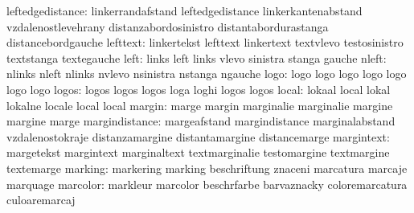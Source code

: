          leftedgedistance: linkerrandafstand         leftedgedistance
                           linkerkantenabstand       vzdalenostlevehrany
                           distanzabordosinistro     distantabordurastanga
                           distancebordgauche
                 lefttext: linkertekst               lefttext
                           linkertext                textvlevo
                           testosinistro             textstanga
                           textegauche
                     left: links                     left
                           links                     vlevo
                           sinistra                  stanga
                           gauche
                    nleft: nlinks                    nleft
                           nlinks                    nvlevo
                           nsinistra                 nstanga
                           ngauche
                     logo: logo                      logo
                           logo                      logo
                           logo                      logo
                           logo
                    logos: logos                     logos
                           logos                     loga
                           loghi                     logos
                           logos
                    local: lokaal                    local
                           lokal                     lokalne
                           locale                    local
                           local
                   margin: marge                     margin
                           marginalie                marginalie
                           margine                   margine
                           marge
           margindistance: margeafstand              margindistance
                           marginalabstand           vzdalenostokraje
                           distanzamargine           distantamargine
                           distancemarge
               margintext: margetekst                margintext
                           marginaltext              textmarginalie
                           testomargine              textmargine
                           textemarge
                  marking: markering                 marking
                           beschriftung              znaceni
                           marcatura                 marcaje
                           marquage
                 marcolor: markleur                  marcolor
                           beschrfarbe               barvaznacky
                           coloremarcatura           culoaremarcaj
